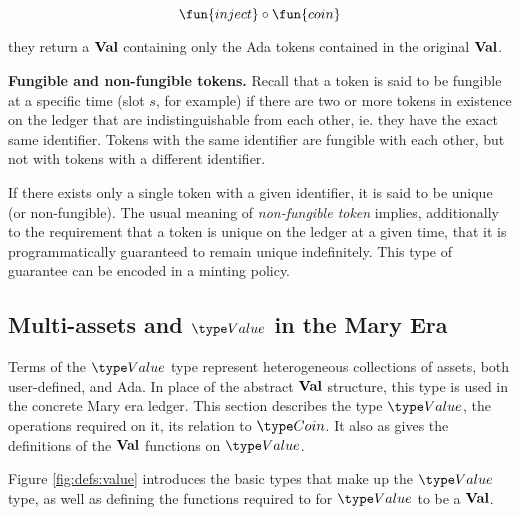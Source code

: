 \[\fun{inject} \circ \fun{coin}\]

they return a $\mathbf{Val}$ containing only the Ada tokens contained in the original $\mathbf{Val}$.

\textbf{Fungible and non-fungible tokens.}
Recall that a token is said to be fungible at a specific time (slot $s$, for example) if
there are two or more tokens in existence on the ledger that are indistinguishable from
each other, ie. they have the exact same identifier. Tokens with the same
identifier are fungible with each other, but not with tokens with a different identifier.

If there exists only a single
token with a given identifier, it is said to be unique (or non-fungible).
The usual meaning of \emph{non-fungible token} implies, additionally to the
requirement that a token is unique on the ledger at a given time, that
it is programmatically guaranteed to remain unique indefinitely. This
type of guarantee can be encoded in a minting policy.


\subsection{Multi-assets and $\Value$ in the Mary Era}

Terms of the $\Value$ type represent heterogeneous collections of assets,
both user-defined, and Ada. In place of the abstract $\mathbf{Val}$ structure,
this type is used in the concrete Mary era ledger.
This section describes the type $\Value$, the operations required on
it, its relation to $\Coin$. It also as gives the definitions of the
$\mathbf{Val}$ functions on $\Value$.

Figure \ref{fig:defs:value} introduces the basic types that make up the $\Value$ type,
as well as defining the functions required to for $\Value$ to be a $\mathbf{Val}$.

